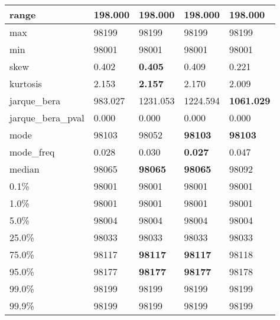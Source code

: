 \begin{table}[H]
\begin{tabular}{|l|m{10em}|m{10em}|m{10em}|m{10em}|}
\hline range & 198.000 & 198.000 & 198.000 & 198.000 \\
\hline max & 98199 & 98199 & 98199 & 98199 \\
\hline min & 98001 & 98001 & 98001 & 98001 \\
\hline skew & 0.402 & \bfseries 0.405 & 0.409 & \cellcolor[rgb]{0.9, 0.54, 0.52} 0.221 \\
\hline kurtosis & 2.153 & \bfseries 2.157 & 2.170 & \cellcolor[rgb]{0.9, 0.54, 0.52} 2.009 \\
\hline jarque\_bera & 983.027 & \cellcolor[rgb]{0.9, 0.54, 0.52} 1231.053 & 1224.594 & \bfseries 1061.029 \\
\hline jarque\_bera\_pval & 0.000 & 0.000 & 0.000 & 0.000 \\
\hline mode & 98103 & \cellcolor[rgb]{0.9, 0.54, 0.52} 98052 & \bfseries 98103 & \bfseries 98103 \\
\hline mode\_freq & 0.028 & 0.030 & \bfseries 0.027 & \cellcolor[rgb]{0.9, 0.54, 0.52} 0.047 \\
\hline median & 98065 & \bfseries 98065 & \bfseries 98065 & \cellcolor[rgb]{0.9, 0.54, 0.52} 98092 \\
\hline 0.1\% & 98001 & 98001 & 98001 & 98001 \\
\hline 1.0\% & 98001 & 98001 & 98001 & 98001 \\
\hline 5.0\% & 98004 & 98004 & 98004 & 98004 \\
\hline 25.0\% & 98033 & 98033 & 98033 & 98033 \\
\hline 75.0\% & 98117 & \bfseries 98117 & \bfseries 98117 & \cellcolor[rgb]{0.9, 0.54, 0.52} 98118 \\
\hline 95.0\% & 98177 & \bfseries 98177 & \bfseries 98177 & \cellcolor[rgb]{0.9, 0.54, 0.52} 98178 \\
\hline 99.0\% & 98199 & 98199 & 98199 & 98199 \\
\hline 99.9\% & 98199 & 98199 & 98199 & 98199 \\
\hline
\end{tabular}
\end{table}
